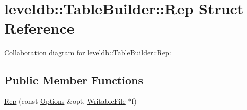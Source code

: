 \hypertarget{structleveldb_1_1_table_builder_1_1_rep}{\section{leveldb\-:\-:Table\-Builder\-:\-:Rep Struct Reference}
\label{structleveldb_1_1_table_builder_1_1_rep}
}


Collaboration diagram for leveldb\-:\-:Table\-Builder\-:\-:Rep\-:
\subsection*{Public Member Functions}
\begin{DoxyCompactItemize}
\item 
\hyperlink{structleveldb_1_1_table_builder_1_1_rep_a9d68c60c57e7336aa1fd10fc9f32213e}{Rep} (const \hyperlink{structleveldb_1_1_options}{Options} \&opt, \hyperlink{classleveldb_1_1_writable_file}{Writable\-File} $\ast$f)
\end{DoxyCompactItemize}
